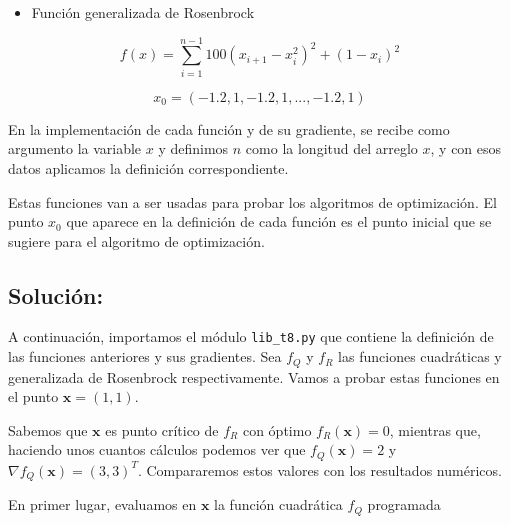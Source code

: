\documentclass[11pt]{article}
\providecommand{\tightlist}{%
      \setlength{\itemsep}{0pt}\setlength{\parskip}{0pt}}
\begin{document}
\begin{itemize}
\tightlist
\item
  Función generalizada de Rosenbrock
\end{itemize}

\[  f(x) = \sum_{i=1}^{n-1} 100(x_{i+1} - x_i^2)^2 + (1 - x_{i} )^2  \]

\[ x_0 = (-1.2, 1, -1.2, 1, ..., -1.2, 1) \]

En la implementación de cada función y de su gradiente, se recibe como
argumento la variable \(x\) y definimos \(n\) como la longitud del
arreglo \(x\), y con esos datos aplicamos la definición correspondiente.

Estas funciones van a ser usadas para probar los algoritmos de
optimización. El punto \(x_0\) que aparece en la definición de cada
función es el punto inicial que se sugiere para el algoritmo de
optimización.

\hypertarget{soluciuxf3n}{%
\subsection{Solución:}\label{soluciuxf3n}}

    A continuación, importamos el módulo \texttt{lib\_t8.py} que contiene la
definición de las funciones anteriores y sus gradientes. Sea \(f_Q\) y
\(f_R\) las funciones cuadráticas y generalizada de Rosenbrock
respectivamente. Vamos a probar estas funciones en el punto
\(\mathbf{x}=(1,1)\).

Sabemos que \(\mathbf{x}\) es punto crítico de \(f_R\) con óptimo
\(f_R(\mathbf{x})=0\), mientras que, haciendo unos cuantos cálculos
podemos ver que \(f_Q(\mathbf{x})=2\) y
\(\nabla f_Q(\mathbf{x})=(3,3)^T\). Compararemos estos valores con los
resultados numéricos.

En primer lugar, evaluamos en \(\mathbf{x}\) la función cuadrática
\(f_Q\) programada
\end{document}
